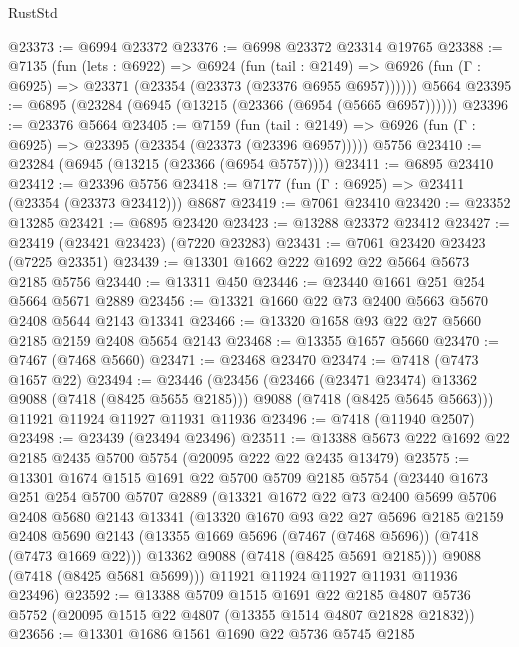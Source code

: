 \begin{lexlean}{RustStd}
\begin{coremodule}
@23373 := @6994 @23372
@23376 := @6998 @23372 @23314 @19765
@23388 := @7135
    (fun (lets : @6922) =>
    @6924
      (fun (tail : @2149) =>
      @6926 (fun (Γ : @6925) => @23371 (@23354 (@23373 (@23376 @6955 @6957))))))
    @5664
@23395 := @6895 (@23284 (@6945 (@13215 (@23366 (@6954 (@5665 @6957))))))
@23396 := @23376 @5664
@23405 := @7159
    (fun (tail : @2149) => @6926 (fun (Γ : @6925) => @23395 (@23354 (@23373 (@23396 @6957)))))
    @5756
@23410 := @23284 (@6945 (@13215 (@23366 (@6954 @5757))))
@23411 := @6895 @23410
@23412 := @23396 @5756
@23418 := @7177 (fun (Γ : @6925) => @23411 (@23354 (@23373 @23412))) @8687
@23419 := @7061 @23410
@23420 := @23352 @13285
@23421 := @6895 @23420
@23423 := @13288 @23372 @23412
@23427 := @23419 (@23421 @23423) (@7220 @23283)
@23431 := @7061 @23420 @23423 (@7225 @23351)
@23439 := @13301 @1662 @222 @1692 @22 @5664 @5673 @2185 @5756
@23440 := @13311 @450
@23446 := @23440 @1661 @251 @254 @5664 @5671 @2889
@23456 := @13321 @1660 @22 @73 @2400 @5663 @5670 @2408 @5644 @2143 @13341
@23466 := @13320 @1658 @93 @22 @27 @5660 @2185 @2159 @2408 @5654 @2143
@23468 := @13355 @1657 @5660
@23470 := @7467 (@7468 @5660)
@23471 := @23468 @23470
@23474 := @7418 (@7473 @1657 @22)
@23494 := @23446
    (@23456
      (@23466 (@23471 @23474) @13362 @9088 (@7418 (@8425 @5655 @2185)))
      @9088
      (@7418 (@8425 @5645 @5663)))
    @11921
    @11924
    @11927
    @11931
    @11936
@23496 := @7418 (@11940 @2507)
@23498 := @23439 (@23494 @23496)
@23511 := @13388 @5673 @222 @1692 @22 @2185 @2435 @5700 @5754 (@20095 @222 @22 @2435 @13479)
@23575 := @13301
    @1674
    @1515
    @1691
    @22
    @5700
    @5709
    @2185
    @5754
    (@23440
      @1673
      @251
      @254
      @5700
      @5707
      @2889
      (@13321
        @1672
        @22
        @73
        @2400
        @5699
        @5706
        @2408
        @5680
        @2143
        @13341
        (@13320
          @1670
          @93
          @22
          @27
          @5696
          @2185
          @2159
          @2408
          @5690
          @2143
          (@13355 @1669 @5696 (@7467 (@7468 @5696)) (@7418 (@7473 @1669 @22)))
          @13362
          @9088
          (@7418 (@8425 @5691 @2185)))
        @9088
        (@7418 (@8425 @5681 @5699)))
      @11921
      @11924
      @11927
      @11931
      @11936
      @23496)
@23592 := @13388
    @5709
    @1515
    @1691
    @22
    @2185
    @4807
    @5736
    @5752
    (@20095 @1515 @22 @4807 (@13355 @1514 @4807 @21828 @21832))
@23656 := @13301
    @1686
    @1561
    @1690
    @22
    @5736
    @5745
    @2185

\end{coremodule}
\end{lexlean}
